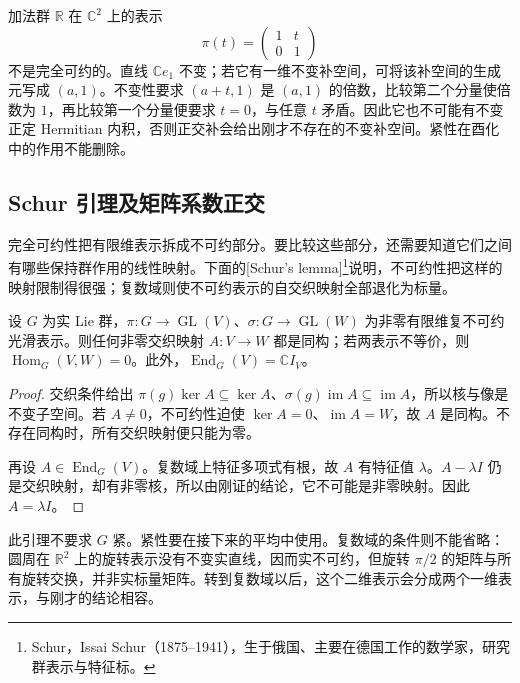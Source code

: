 \begin{example}\label{g1:exm:noncompact-nonsemisimple-representation}
	加法群 \(\mathbb R\) 在 \(\mathbb C^2\) 上的表示
	\[
		\pi(t)=\begin{pmatrix}1&t\\0&1\end{pmatrix}
	\]
	不是完全可约的。直线 \(\mathbb Ce_1\) 不变；若它有一维不变补空间，可将该补空间的生成元写成 \((a,1)\)。不变性要求 \((a+t,1)\) 是 \((a,1)\) 的倍数，比较第二个分量使倍数为 \(1\)，再比较第一个分量便要求 \(t=0\)，与任意 \(t\) 矛盾。因此它也不可能有不变正定 Hermitian 内积，否则正交补会给出刚才不存在的不变补空间。紧性在酉化中的作用不能删除。
\end{example}

\subsection{Schur 引理及矩阵系数正交}
\label{g1:subsec:2001:02}

完全可约性把有限维表示拆成不可约部分。要比较这些部分，还需要知道它们之间有哪些保持群作用的线性映射。下面的[Schur's lemma]\footnote{Schur，Issai Schur（1875--1941），生于俄国、主要在德国工作的数学家，研究群表示与特征标。}说明，不可约性把这样的映射限制得很强；复数域则使不可约表示的自交织映射全部退化为标量。

\begin{lemma}[复 Schur 引理]\label{g1:lem:complex-schur}
	设 \(G\) 为实 Lie 群，\(\pi:G\to\operatorname{GL}(V)\)、\(\sigma:G\to\operatorname{GL}(W)\) 为非零有限维复不可约光滑表示。则任何非零交织映射 \(A:V\to W\) 都是同构；若两表示不等价，则 \(\operatorname{Hom}_G(V,W)=0\)。此外，\(\operatorname{End}_G(V)=\mathbb C I_V\)。
\end{lemma}
\begin{proof}
	交织条件给出 \(\pi(g)\ker A\subseteq\ker A\)、\(\sigma(g)\operatorname{im}A\subseteq\operatorname{im}A\)，所以核与像是不变子空间。若 \(A\ne0\)，不可约性迫使 \(\ker A=0\)、\(\operatorname{im}A=W\)，故 \(A\) 是同构。不存在同构时，所有交织映射便只能为零。

	再设 \(A\in\operatorname{End}_G(V)\)。复数域上特征多项式有根，故 \(A\) 有特征值 \(\lambda\)。\(A-\lambda I\) 仍是交织映射，却有非零核，所以由刚证的结论，它不可能是非零映射。因此 \(A=\lambda I\)。
\end{proof}

此引理不要求 \(G\) 紧。紧性要在接下来的平均中使用。复数域的条件则不能省略：圆周在 \(\mathbb R^2\) 上的旋转表示没有不变实直线，因而实不可约，但旋转 \(\pi/2\) 的矩阵与所有旋转交换，并非实标量矩阵。转到复数域以后，这个二维表示会分成两个一维表示，与刚才的结论相容。

